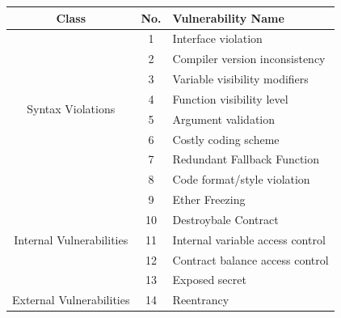\documentclass[a4paper,11pt]{article}
\begin{document}
\begin{table}[t]
        \begin{center}
            \small
            \begin{tabular}{||c|c|l||}
                \hline
                Class & No. & Vulnerability Name\\ 
                \hline
                \hline
                \multirow{8}{*}{Syntax Violations}                              & 1  & Interface violation \\ \cline{2-3}
                                                                                & 2  & Compiler version inconsistency \\ \cline{2-3}
                                                                                & 3  & Variable visibility modifiers \\ \cline{2-3}
                                                                                & 4  & Function visibility level  \\ \cline{2-3}
                                                                                & 5  & Argument validation  \\ \cline{2-3}
                                                                                & 6  & Costly coding scheme  \\ \cline{2-3}
                                                                                & 7  & Redundant Fallback Function  \\ \cline{2-3}
                                                                                & 8  & Code format/style violation  \\ \cline{1-3}
                \multirow{5}{*}{Internal Vulnerabilities}                       & 9  & Ether Freezing \\ \cline{2-3}
                                                                                & 10 & Destroybale Contract  \\ \cline{2-3}
                                                                                & 11 & Internal variable access control  \\ \cline{2-3}
                                                                                & 12 & Contract balance access control  \\ \cline{2-3}
                                                                                & 13 & Exposed secret \\ \cline{1-3}
                \multirow{6}{*}{External Vulnerabilities}                       & 14 & Reentrancy \\ \cline{2-3}

\end{tabular}
\end{center}
\end{table}
\end{document}
